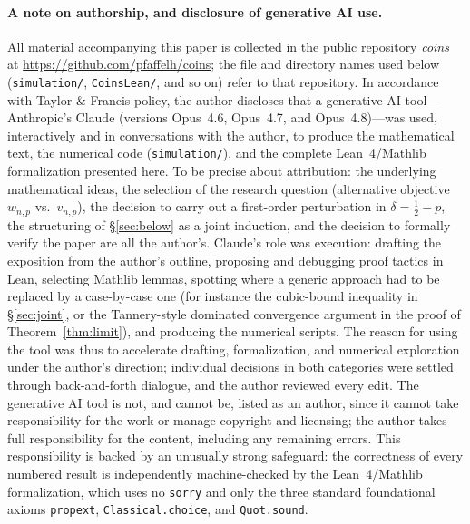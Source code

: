 \documentclass[12pt]{article}
\theoremstyle{definition}
\theoremstyle{remark}
\begin{document}
\paragraph{A note on authorship, and disclosure of generative AI use.}
All material accompanying this paper is collected in the public
repository \emph{coins} at \url{https://github.com/pfaffelh/coins};
the file and directory names used below
(\texttt{simulation/}, \texttt{CoinsLean/}, and so on) refer to that
repository.
In accordance with Taylor \& Francis policy, the author discloses that
a generative AI tool---Anthropic's Claude (versions Opus~4.6,
Opus~4.7, and Opus~4.8)---was used, interactively and in conversations
with the author, to produce the mathematical text, the numerical code
(\texttt{simulation/}), and the complete Lean~4/Mathlib formalization
presented here.  To be precise about attribution: the underlying
mathematical ideas, the selection of the research question
(alternative objective $w_{n,p}$ vs.\ $v_{n,p}$), the decision to
carry out a first-order perturbation in $\delta=\tfrac12-p$, the
structuring of \S\ref{sec:below} as a joint induction, and the
decision to formally verify the paper are all the author's.
Claude's role was execution: drafting the exposition from the
author's outline, proposing and debugging proof tactics in Lean,
selecting Mathlib lemmas, spotting where a generic approach had to
be replaced by a case-by-case one (for instance the cubic-bound
inequality in \S\ref{sec:joint}, or the Tannery-style dominated
convergence argument in the proof of Theorem~\ref{thm:limit}), and
producing the numerical scripts.  The reason for using the tool was
thus to accelerate drafting, formalization, and numerical exploration
under the author's direction; individual decisions in both categories
were settled through back-and-forth dialogue, and the author reviewed
every edit.  The generative AI tool is not, and cannot be, listed as
an author, since it cannot take responsibility for the work or manage
copyright and licensing; the author takes full responsibility for the
content, including any remaining errors.  This responsibility is
backed by an unusually strong safeguard: the correctness of every
numbered result is independently machine-checked by the
Lean~4/Mathlib formalization, which uses no \texttt{sorry} and only
the three standard foundational axioms \texttt{propext},
\texttt{Classical.choice}, and \texttt{Quot.sound}.
\end{document}

